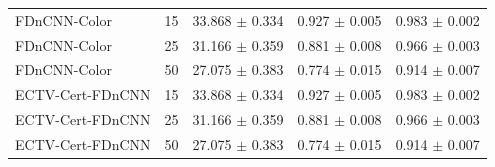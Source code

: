 \begin{tabular}{lcccc}
FDnCNN-Color & 15 & 33.868 $\pm$ 0.334 & 0.927 $\pm$ 0.005 & 0.983 $\pm$ 0.002 \\
FDnCNN-Color & 25 & 31.166 $\pm$ 0.359 & 0.881 $\pm$ 0.008 & 0.966 $\pm$ 0.003 \\
FDnCNN-Color & 50 & 27.075 $\pm$ 0.383 & 0.774 $\pm$ 0.015 & 0.914 $\pm$ 0.007 \\
ECTV-Cert-FDnCNN & 15 & 33.868 $\pm$ 0.334 & 0.927 $\pm$ 0.005 & 0.983 $\pm$ 0.002 \\
ECTV-Cert-FDnCNN & 25 & 31.166 $\pm$ 0.359 & 0.881 $\pm$ 0.008 & 0.966 $\pm$ 0.003 \\
ECTV-Cert-FDnCNN & 50 & 27.075 $\pm$ 0.383 & 0.774 $\pm$ 0.015 & 0.914 $\pm$ 0.007 \\
\bottomrule
\end{tabular}
